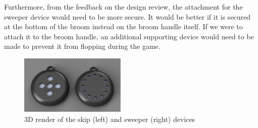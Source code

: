 \documentclass{article}
\begin{document}
Furthermore, from the feedback on the design review, the attachment for the sweeper device would need to be more secure. It would be better if it is secured at the bottom of the broom instead on the broom handle itself. If we were to attach it to the broom handle, an additional supporting device would need to be made to prevent it from flopping during the game.
\begin{figure}[ht!]
    \centering
    \includegraphics[width=0.45\textwidth]{design_renders.png}
    \caption{3D render of the skip (left) and sweeper (right) devices}
    \label{fig:3d_render}
\end{figure}

\end{document}

